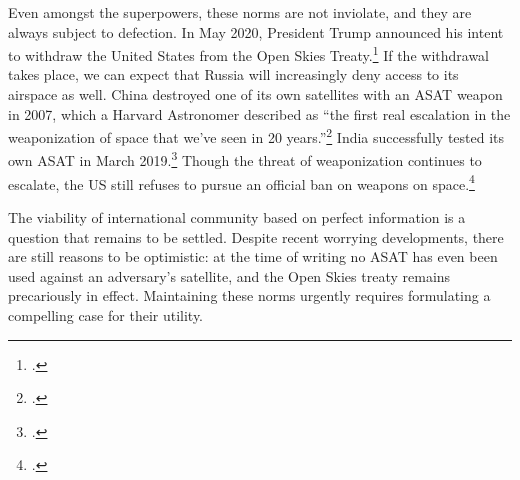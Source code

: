 \documentclass[12pt]{extarticle}
\begin{document}
Even amongst the superpowers, these norms are not inviolate, and they are always subject to defection. In May 2020, President Trump announced his intent to withdraw the United States from the Open Skies Treaty.\footcite{sanger_trump_2020} If the withdrawal takes place, we can expect that Russia will increasingly deny access to its airspace as well. China destroyed one of its own satellites with an ASAT weapon in 2007, which a Harvard Astronomer described as ``the first real escalation in the weaponization of space that we’ve seen in 20 years.''\footcite{broad_china_2007} India successfully tested its own ASAT in March 2019.\footcite{gettleman_india_2019} Though the threat of weaponization continues to escalate, the US still refuses to pursue an official ban on weapons on space.\footcite{oconnor_u.s._2019}

The viability of international community based on perfect information is a question that remains to be settled. Despite recent worrying developments, there are still reasons to be optimistic: at the time of writing no ASAT has even been used against an adversary's satellite, and the Open Skies treaty remains precariously in effect. Maintaining these norms urgently requires formulating a compelling case for their utility.
\end{document}
